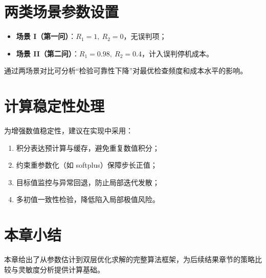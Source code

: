 \section{两类场景参数设置}
\begin{itemize}
  \item \textbf{场景 I（第一问）}：$R_1=1,\ R_2=0$，无误判项；
  \item \textbf{场景 II（第二问）}：$R_1=0.98,\ R_2=0.4$，计入误判停机成本。
\end{itemize}
通过两场景对比可分析“检验可靠性下降”对最优检查频度和成本水平的影响。

\section{计算稳定性处理}
为增强数值稳定性，建议在实现中采用：
\begin{enumerate}
  \item 积分表达预计算与缓存，避免重复数值积分；
  \item 约束重参数化（如 softplus）保障步长正值；
  \item 目标值监控与异常回退，防止局部迭代发散；
  \item 多初值一致性检验，降低陷入局部极值风险。
\end{enumerate}

\section{本章小结}
本章给出了从参数估计到双层优化求解的完整算法框架，为后续结果章节的策略比较与灵敏度分析提供计算基础。
